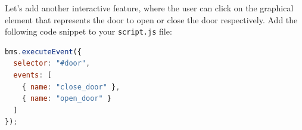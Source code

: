 Let's add another interactive feature, where the user can click on the graphical element that represents the door to open or close the door respectively.
%
Add the following code snippet to your \texttt{script.js} file:
\begin{lstlisting}[language=JavaScript, caption={Interaction with the Lift Door (JavaScript)}]
bms.executeEvent({
  selector: "#door",
  events: [
    { name: "close_door" }, 
    { name: "open_door" }
  ]
});
\end{lstlisting}

